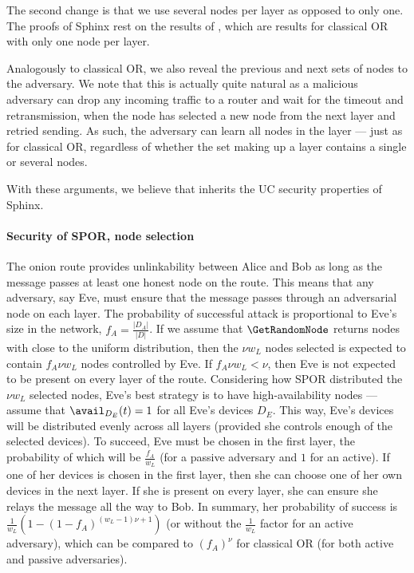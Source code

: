 The second change is that we use several nodes per layer as opposed to only 
one.
The proofs of Sphinx rest on the results of \textcite{CLOnionRouting}, which 
are results for classical \ac{OR} with only one node per layer.

Analogously to classical \ac{OR}, we also reveal the previous and next sets of 
nodes to the adversary. We note that this is actually quite natural as a 
malicious adversary can drop any incoming traffic to a router and wait for the 
timeout and
retransmission, \ie when the 
node has selected a new node from the next layer and retried sending.
As such, the adversary can learn all nodes in the layer --- just as for 
classical \ac{OR}, regardless of whether the set making up a layer contains a
single or several nodes.

With these arguments, we believe that \Sphinxes inherits the \ac{UC} security 
properties of Sphinx. %

\paragraph*{Security of \acs*{SPOR}, node selection}

The onion route provides unlinkability between Alice and Bob as long as the 
message passes at least one honest node on the route.
This means that any adversary, say Eve,  must ensure that the message passes 
through an adversarial node on each layer.
The probability of successful attack is proportional to Eve's size in the 
network, \ie \(f_A = \frac{|D_A|}{|D|}\).
If we assume that \(\GetRandomNode\) returns nodes with close to the uniform 
distribution, then the \(\nu w_L\) nodes selected is expected to contain \(f_A 
  \nu w_L\) nodes controlled by Eve.
If \(f_A \nu w_L < \nu\), then Eve is not expected to be present on every layer 
of the route.
Considering how \ac{SPOR} distributed the \(\nu w_L\) selected nodes, Eve's 
best strategy is to have high-availability nodes --- assume that 
\(\avail_{D_E}(t) = 1\) for all Eve's devices \(D_E\).
This way, Eve's devices will be distributed evenly across all layers (provided 
she controls enough of the selected devices).
To succeed, Eve must be chosen in the first layer, the probability of which 
will be \(\frac{f_A}{w_L}\) (for a passive adversary and \(1\) for an active).
If one of her devices is chosen in the first layer, then she can choose one of 
her own devices in the next layer.
If she is present on every layer, she can ensure she relays the message all the 
way to Bob.
In summary, her probability of success is \(\frac{1}{w_L} (1-(1-f_A)^{(w_L-1) 
    \nu +1})\) (or without the \(\frac{1}{w_L}\) factor for an active 
adversary), which can be compared to \((f_A)^\nu\) for classical \ac{OR} (for 
both active and passive adversaries).


